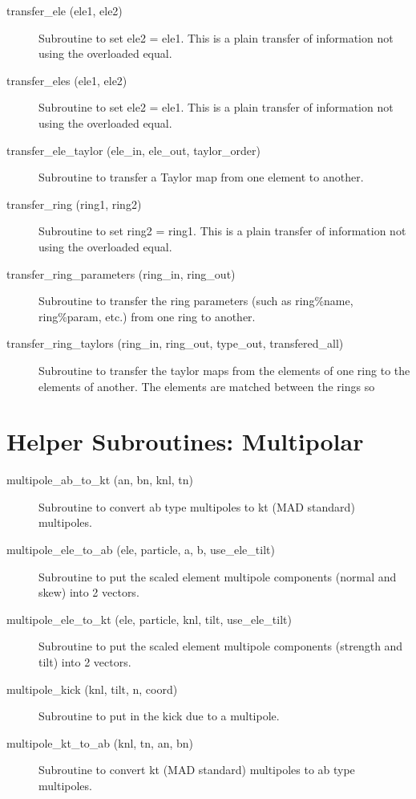 \begin{description}
\item[transfer\_ele (ele1, ele2)] \Newline 
     Subroutine to set ele2 = ele1. 
     This is a plain transfer of information not using the overloaded equal.

\item[transfer\_eles (ele1, ele2)] \Newline 
     Subroutine to set ele2 = ele1. 
     This is a plain transfer of information not using the overloaded equal.

\item[transfer\_ele\_taylor (ele\_in, ele\_out, taylor\_order)] \Newline 
     Subroutine to transfer a Taylor map from one element to another.

\item[transfer\_ring (ring1, ring2)] \Newline 
     Subroutine to set ring2 = ring1. 
     This is a plain transfer of information not using the overloaded equal.

\item[transfer\_ring\_parameters (ring\_in, ring\_out)] \Newline
Subroutine to transfer the ring parameters (such as ring\%name, 
ring\%param, etc.) from one ring to another. 

\item[transfer\_ring\_taylors (ring\_in, ring\_out, 
                        type\_out, transfered\_all) ] \Newline 
     Subroutine to transfer the taylor maps from the elements of one ring to
     the elements of another. The elements are matched between the rings so 

\end{description}

\section{Helper Subroutines: Multipolar}
\label{r:multi}    

\begin{description}

\item[multipole\_ab\_to\_kt (an, bn, knl, tn)] \Newline
Subroutine to convert ab type multipoles to kt (MAD standard) multipoles. 

\item[multipole\_ele\_to\_ab (ele, particle, a, b, use\_ele\_tilt)] \Newline
Subroutine to put the scaled element multipole components (normal and skew) into 2 vectors. 

\item[multipole\_ele\_to\_kt (ele, particle, knl, tilt, use\_ele\_tilt)] \Newline
Subroutine to put the scaled element multipole components (strength and tilt) into 2 vectors. 

\item[multipole\_kick (knl, tilt, n, coord)] \Newline
Subroutine to put in the kick due to a multipole. 

\item[multipole\_kt\_to\_ab (knl, tn, an, bn)] \Newline
Subroutine to convert kt (MAD standard) multipoles to ab type multipoles. 

\end{description}

